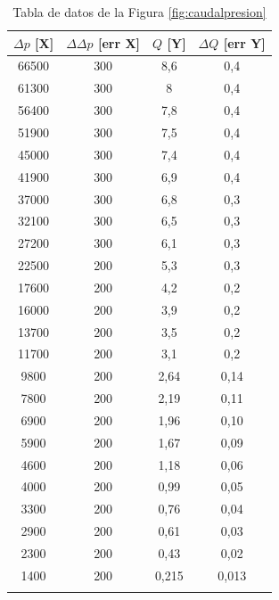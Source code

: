 \documentclass[a4paper,12pt,spanish]{article}
\begin{document}
	
	\begin{longtable}[c]{|c|c|c|c|}
		
		
			\hline
			$\mathit{\Delta}p$ [X]& $\Delta\mathit{\Delta}p$ [err X] & $Q$ [Y]& $\Delta Q$ [err Y]\\ \hline\hline
			\endfirsthead
			\endhead
			66500 & 300 & 8,6 & 0,4 \\ \hline
			61300 & 300 & 8 & 0,4 \\ \hline
			56400 & 300 & 7,8 & 0,4 \\ \hline
			51900 & 300 & 7,5 & 0,4 \\ \hline
			45000 & 300 & 7,4 & 0,4 \\ \hline
			41900 & 300 & 6,9 & 0,4 \\ \hline
			37000 & 300 & 6,8 & 0,3 \\ \hline
			32100 & 300 & 6,5 & 0,3 \\ \hline
			27200 & 300 & 6,1 & 0,3 \\ \hline
			22500 & 200 & 5,3 & 0,3 \\ \hline
			17600 & 200 & 4,2 & 0,2 \\ \hline
			16000 & 200 & 3,9 & 0,2 \\ \hline
			13700 & 200 & 3,5 & 0,2 \\ \hline
			11700 & 200 & 3,1 & 0,2 \\ \hline
			9800 & 200 & 2,64 & 0,14 \\ \hline
			7800 & 200 & 2,19 & 0,11 \\ \hline
			6900 & 200 & 1,96 & 0,10 \\ \hline
			5900 & 200 & 1,67 & 0,09 \\ \hline
			4600 & 200 & 1,18 & 0,06 \\ \hline
			4000 & 200 & 0,99 & 0,05 \\ \hline
			3300 & 200 & 0,76 & 0,04 \\ \hline
			2900 & 200 & 0,61 & 0,03 \\ \hline
			2300 & 200 & 0,43 & 0,02 \\ \hline
			1400 & 200 & 0,215 & 0,013 \\ \hline
		
		\caption{Tabla de datos de la Figura \ref{fig:caudalpresion}}
	\end{longtable}
	
\end{document}
